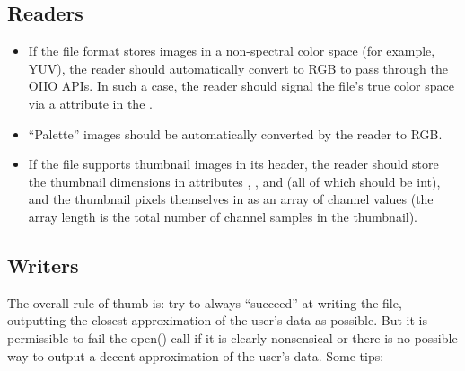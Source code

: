 \subsection*{Readers}
\begin{itemize}
\item If the file format stores images in a non-spectral color space
  (for example, YUV), the reader should automatically convert to RGB to
  pass through the OIIO APIs.  In such a case, the reader should signal
  the file's true color space via a  attribute in
  the \ImageSpec.
\item ``Palette'' images should be automatically converted by the reader
  to RGB.
\item If the file supports thumbnail images in its header, the reader
  should store the thumbnail dimensions in attributes
  , , and
   (all of which should be {\cf int}), and the
  thumbnail pixels themselves in  as an array of
  channel values (the array length is the total number of channel
  samples in the thumbnail).
\end{itemize}

\subsection*{Writers}

The overall rule of thumb is: try to always ``succeed'' at writing the
file, outputting the closest approximation of the user's data as
possible.  But it is permissible to fail the {\cf open()} call if it is
clearly nonsensical or there is no possible way to output a decent
approximation of the user's data.  Some tips:

